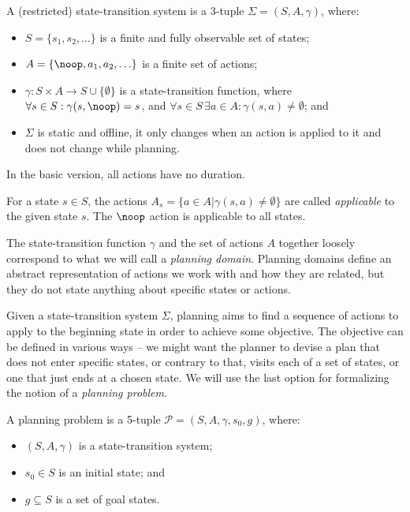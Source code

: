 \begin{defn}\label{defn:state-transition-sys}
A (restricted) state-transition system is a 3-tuple $\Sigma = (S, A, \gamma)$, where:
\begin{itemize}
\item $S = \{s_1, s_2, \ldots\}$ is a finite and fully observable set of states;
\item $A = \{\noop, a_1, a_2, \ldots\}$ is a finite set of actions;
\item $\gamma: S \times A \to S \cup \{\emptyset\}$ is a state-transition function,
where $\forall s \in S : \gamma(s, \noop) = s$,
and $\forall s \in S\,\exists a \in A : \gamma(s, a) \neq \emptyset$; and
\item $\Sigma$ is static and offline,
it only changes when an action is applied to it and does not change while planning.
\end{itemize}
In the basic version, all actions have no duration.
\end{defn}

For a state $s \in S$, the actions $A_s = \{a \in A | \gamma(s, a) \neq \emptyset\}$ are called \textit{applicable}
to the given state $s$. The $\noop$ action is applicable to all states.

The state-transition function $\gamma$ and the set of actions $A$ together loosely correspond to what we will call a \textit{planning domain}.
Planning domains define an abstract representation of actions we work with
and how they are related,
but they do not state anything about specific states or actions.

Given a state-transition system $\Sigma$, planning aims to find a
sequence of actions to apply to the beginning state in order to achieve some objective.
The objective can be defined in various ways -- we might want the planner
to devise a plan that
does not enter specific states, or contrary to that, visits each of a set of states,
or one that just ends at a chosen state.
We will use the last option for formalizing the notion of a \textit{planning problem}.

\begin{defn}\label{defn:planning-problem}\citep[Part~I]{Ghallab2004}
A planning problem is a 5-tuple $\mathcal{P} = (S, A, \gamma, s_0, g)$, where:
\begin{itemize}
\item $(S, A, \gamma)$ is a state-transition system;
\item $s_0 \in S$ is an initial state; and
\item $g \subseteq S$ is a set of goal states.
\end{itemize}
\end{defn}

